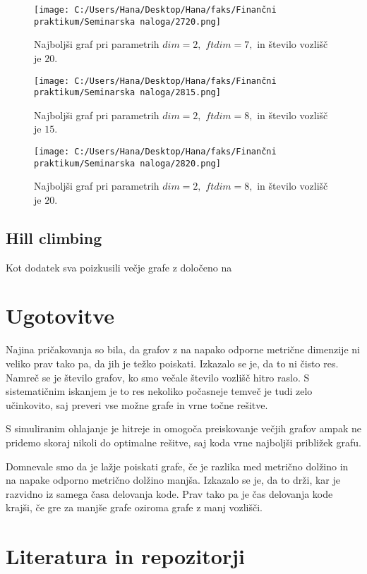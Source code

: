 \documentclass[12pt]{article}
\begin{document}
\begin{figure}[H]
    \centering
    \texttt{[image: C:/Users/Hana/Desktop/Hana/faks/Finančni praktikum/Seminarska naloga/2720.png]}
    \caption{Najboljši graf pri parametrih $dim = 2,$ $ftdim = 7,$ in število vozlišč je $20.$}
    \label{fig:slika2720}
\end{figure}


\begin{figure}[H]
    \centering
    \texttt{[image: C:/Users/Hana/Desktop/Hana/faks/Finančni praktikum/Seminarska naloga/2815.png]}
    \caption{Najboljši graf pri parametrih $dim = 2,$ $ftdim = 8,$ in število vozlišč je $15.$}
    \label{fig:slika2815}
\end{figure}

\begin{figure}[H]
    \centering
    \texttt{[image: C:/Users/Hana/Desktop/Hana/faks/Finančni praktikum/Seminarska naloga/2820.png]}
    \caption{Najboljši graf pri parametrih $dim = 2,$ $ftdim = 8,$ in število vozlišč je $20.$}
    \label{fig:slika2820}
\end{figure}

\subsection{Hill climbing}

Kot dodatek sva poizkusili večje grafe z določeno na 


\section{Ugotovitve}

Najina pričakovanja so bila, da grafov z na napako odporne metrične dimenzije ni veliko prav tako pa, 
da jih je težko poiskati. Izkazalo se je, da to ni čisto res. Namreč se je število grafov, ko smo večale 
število vozlišč hitro raslo. S sistematičnim iskanjem je to res nekoliko počasneje temveč je tudi zelo 
učinkovito, saj preveri vse možne grafe in vrne točne rešitve. 

S simuliranim ohlajanje je hitreje in omogoča preiskovanje večjih grafov ampak ne pridemo skoraj nikoli 
do optimalne rešitve, saj koda vrne najboljši približek grafu.

Domnevale smo da je lažje poiskati grafe, če je razlika med metrično dolžino in na napake odporno metrično
dolžino manjša. Izkazalo se je, da to drži, kar je razvidno iz samega časa delovanja kode. Prav tako pa je
čas delovanja kode krajši, če gre za manjše grafe oziroma grafe z manj vozlišči. 


\section{Literatura in repozitorji}
\end{document}
